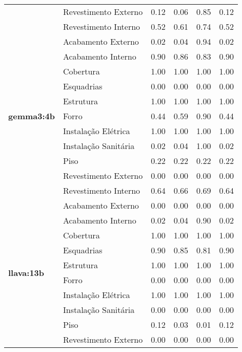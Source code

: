 \begin{table}[htbp]
\begin{tabular}{llcccc}
     & \multirow{1}{*}{Revestimento Externo} & 0.12 & 0.06 & 0.85 & 0.12 \\
     & \multirow{1}{*}{Revestimento Interno} & 0.52 & 0.61 & 0.74 & 0.52 \\
    \midrule
    \multirow{11}{*}{\textbf{gemma3:4b}} & \multirow{1}{*}{Acabamento Externo} & 0.02 & 0.04 & 0.94 & 0.02 \\
     & \multirow{1}{*}{Acabamento Interno} & 0.90 & 0.86 & 0.83 & 0.90 \\
     & \multirow{1}{*}{Cobertura} & 1.00 & 1.00 & 1.00 & 1.00 \\
     & \multirow{1}{*}{Esquadrias} & 0.00 & 0.00 & 0.00 & 0.00 \\
     & \multirow{1}{*}{Estrutura} & 1.00 & 1.00 & 1.00 & 1.00 \\
     & \multirow{1}{*}{Forro} & 0.44 & 0.59 & 0.90 & 0.44 \\
     & \multirow{1}{*}{Instalação Elétrica} & 1.00 & 1.00 & 1.00 & 1.00 \\
     & \multirow{1}{*}{Instalação Sanitária} & 0.02 & 0.04 & 1.00 & 0.02 \\
     & \multirow{1}{*}{Piso} & 0.22 & 0.22 & 0.22 & 0.22 \\
     & \multirow{1}{*}{Revestimento Externo} & 0.00 & 0.00 & 0.00 & 0.00 \\
     & \multirow{1}{*}{Revestimento Interno} & 0.64 & 0.66 & 0.69 & 0.64 \\
    \midrule
    \multirow{11}{*}{\textbf{llava:13b}} & \multirow{1}{*}{Acabamento Externo} & 0.00 & 0.00 & 0.00 & 0.00 \\
     & \multirow{1}{*}{Acabamento Interno} & 0.02 & 0.04 & 0.90 & 0.02 \\
     & \multirow{1}{*}{Cobertura} & 1.00 & 1.00 & 1.00 & 1.00 \\
     & \multirow{1}{*}{Esquadrias} & 0.90 & 0.85 & 0.81 & 0.90 \\
     & \multirow{1}{*}{Estrutura} & 1.00 & 1.00 & 1.00 & 1.00 \\
     & \multirow{1}{*}{Forro} & 0.00 & 0.00 & 0.00 & 0.00 \\
     & \multirow{1}{*}{Instalação Elétrica} & 1.00 & 1.00 & 1.00 & 1.00 \\
     & \multirow{1}{*}{Instalação Sanitária} & 0.00 & 0.00 & 0.00 & 0.00 \\
     & \multirow{1}{*}{Piso} & 0.12 & 0.03 & 0.01 & 0.12 \\
     & \multirow{1}{*}{Revestimento Externo} & 0.00 & 0.00 & 0.00 & 0.00 \\

\end{tabular}
\end{table}
